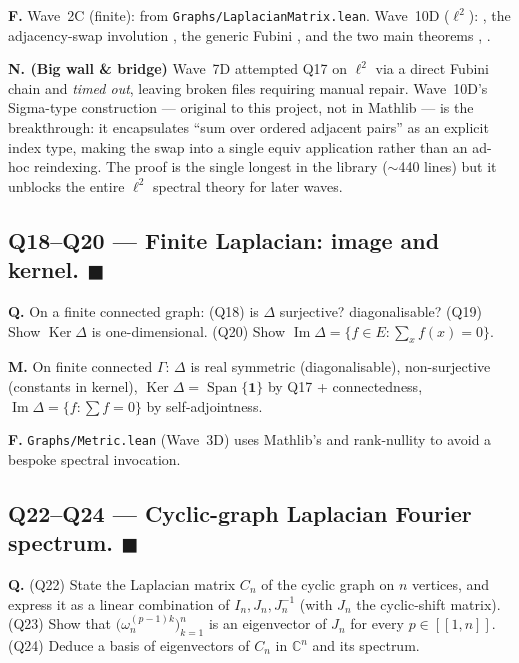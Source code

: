 \documentclass[11pt,a4paper]{article}
\newcommand{\done}[1]{\textcolor{donegreen}{\textbf{#1}}}
\newcommand{\lmod}[1]{\texttt{\small #1}}
\newcommand{\C}{\mathbb{C}}
\newcommand{\Span}{\operatorname{Span}}
\newcommand{\Ker}{\operatorname{Ker}}
\newcommand{\ImM}{\operatorname{Im}}
\theoremstyle{plain}
\theoremstyle{definition}
\begin{document}
\textbf{F.} Wave~2C (finite):
 from
\lmod{Graphs/LaplacianMatrix.lean}. Wave~10D ($\ell^2$):
, the
adjacency-swap involution , the generic Fubini
, and the two main
theorems ,
.

\textbf{N. (Big wall \& bridge)} Wave~7D attempted Q17 on $\ell^2$
via a direct Fubini chain and \emph{timed out}, leaving broken
files requiring manual repair. Wave~10D's Sigma-type construction
--- original to this project, not in Mathlib --- is the
breakthrough: it encapsulates ``sum over ordered adjacent pairs''
as an explicit index type, making the swap into a single equiv
application rather than an ad-hoc reindexing. The proof is the
single longest in the library ($\sim$440 lines) but it unblocks
the entire $\ell^2$ spectral theory for later waves.

\subsection{Q18--Q20 --- Finite Laplacian: image and kernel. \done{$\blacksquare$}}

\textbf{Q.} On a finite connected graph: (Q18) is $\Delta$ surjective?
diagonalisable? (Q19) Show $\Ker \Delta$ is one-dimensional. (Q20)
Show $\ImM \Delta = \{f \in E : \sum_x f(x) = 0\}$.

\textbf{M.} On finite connected $\Gamma$: $\Delta$ is real symmetric
(diagonalisable), non-surjective (constants in kernel),
$\Ker\Delta = \Span\{\mathbf 1\}$ by Q17 + connectedness,
$\ImM\Delta = \{f : \sum f = 0\}$ by self-adjointness.

\textbf{F.} \lmod{Graphs/Metric.lean} (Wave~3D) uses
Mathlib's
and rank-nullity to avoid a bespoke spectral invocation.

\subsection{Q22--Q24 --- Cyclic-graph Laplacian Fourier spectrum. \done{$\blacksquare$}}

\textbf{Q.} (Q22) State the Laplacian matrix $C_n$ of the cyclic
graph on $n$ vertices, and express it as a linear combination of
$I_n, J_n, J_n^{-1}$ (with $J_n$ the cyclic-shift matrix).
(Q23) Show that $\bigl(\omega_n^{(p-1)k}\bigr)_{k=1}^n$ is an
eigenvector of $J_n$ for every $p \in [\![1, n]\!]$.
(Q24) Deduce a basis of eigenvectors of $C_n$ in $\C^n$ and its
spectrum.
\end{document}
